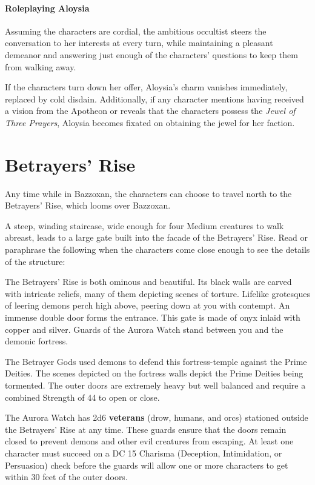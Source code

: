 \documentclass[letterpaper, 11pt, bg=full, twocolumn]{dndbook}
\begin{document}
\paragraph{Roleplaying Aloysia}

Assuming the characters are cordial, the ambitious occultist steers the conversation to her interests at every turn, while maintaining a pleasant demeanor and answering just enough of the characters' questions to keep them from walking away.

If the characters turn down her offer, Aloysia's charm vanishes immediately, replaced by cold disdain. Additionally, if any character mentions having received a vision from the Apotheon or reveals that the characters possess the \textit{Jewel of Three Prayers}, Aloysia becomes fixated on obtaining the jewel for her faction.
\section{Betrayers' Rise}

Any time while in Bazzoxan, the characters can choose to travel north to the Betrayers' Rise, which looms over Bazzoxan.

A steep, winding staircase, wide enough for four Medium creatures to walk abreast, leads to a large gate built into the facade of the Betrayers' Rise. Read or paraphrase the following when the characters come close enough to see the details of the structure:

\begin{DndReadAloud}
The Betrayers' Rise is both ominous and beautiful. Its black walls are carved with intricate reliefs, many of them depicting scenes of torture. Lifelike grotesques of leering demons perch high above, peering down at you with contempt.
An immense double door forms the entrance. This gate is made of onyx inlaid with copper and silver. Guards of the Aurora Watch stand between you and the demonic fortress.
\end{DndReadAloud}

The Betrayer Gods used demons to defend this fortress-temple against the Prime Deities. The scenes depicted on the fortress walls depict the Prime Deities being tormented. The outer doors are extremely heavy but well balanced and require a combined Strength of 44 to open or close.

The Aurora Watch has 2d6 \textbf{veterans} (drow, humans, and orcs) stationed outside the Betrayers' Rise at any time. These guards ensure that the doors remain closed to prevent demons and other evil creatures from escaping. At least one character must succeed on a DC 15 Charisma (Deception, Intimidation, or Persuasion) check before the guards will allow one or more characters to get within 30 feet of the outer doors.
\end{document}
